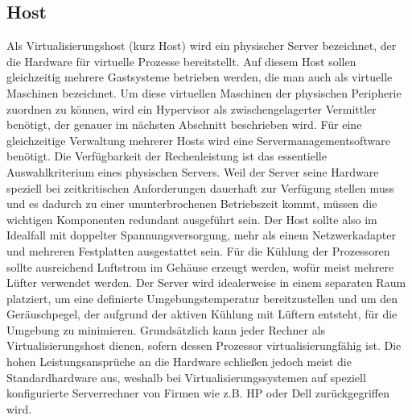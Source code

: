 \subsection{Host}
Als Virtualisierungshost (kurz Host) wird ein physischer Server bezeichnet, der die Hardware für virtuelle Prozesse bereitstellt. Auf diesem Host sollen gleichzeitig mehrere Gastsysteme betrieben werden, die man auch als virtuelle Maschinen bezeichnet. Um diese virtuellen Maschinen der physischen Peripherie zuordnen zu können, wird ein Hypervisor als zwischengelagerter Vermittler benötigt, der genauer im nächsten Abschnitt beschrieben wird. Für eine gleichzeitige Verwaltung mehrerer Hosts wird eine Servermanagementsoftware benötigt. Die Verfügbarkeit der Rechenleistung ist das essentielle Auswahlkriterium eines physischen Servers. Weil der Server seine Hardware speziell bei zeitkritischen Anforderungen dauerhaft zur Verfügung stellen muss und es dadurch zu einer ununterbrochenen Betriebszeit kommt, müssen die wichtigen Komponenten redundant ausgeführt sein. Der Host sollte also im Idealfall mit doppelter Spannungsversorgung, mehr als einem Netzwerkadapter und mehreren Festplatten ausgestattet sein. Für die Kühlung der Prozessoren sollte ausreichend Luftstrom im Gehäuse erzeugt werden, wofür meist mehrere Lüfter verwendet werden. Der Server wird idealerweise in einem separaten Raum platziert, um eine definierte Umgebungstemperatur bereitzustellen und um den Geräuschpegel, der aufgrund der aktiven Kühlung mit Lüftern entsteht, für die Umgebung zu minimieren.
Grundsätzlich kann jeder Rechner als Virtualisierungshost dienen, sofern dessen Prozessor virtualisierungfähig ist. Die hohen Leistungsansprüche an die Hardware schließen jedoch meist die Standardhardware aus, weshalb bei Virtualisierungssystemen auf speziell konfigurierte Serverrechner von Firmen wie z.B. HP oder Dell zurückgegriffen wird. \cite[S.~54]{Wohrmann2018}

